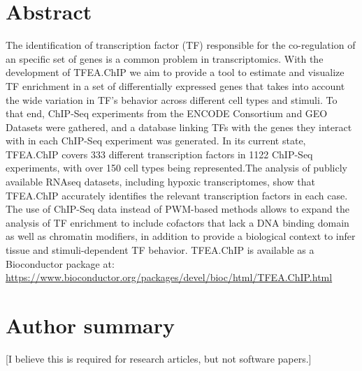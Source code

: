 \documentclass[10pt,letterpaper]{article}
\begin{document}
	\section*{Abstract}
	The identification of transcription factor (TF) responsible for the co-regulation of an specific set of genes is a common problem in transcriptomics. With the development of TFEA.ChIP we aim to provide a tool to estimate and visualize TF enrichment in a set of differentially expressed genes that takes into account the wide variation in TF's behavior across different cell types and stimuli. To that end, ChIP-Seq experiments from the ENCODE Consortium and GEO Datasets were gathered, and a database linking TFs with the genes they interact with in each ChIP-Seq experiment was generated. In its current state, TFEA.ChIP covers 333 different transcription factors in 1122 ChIP-Seq experiments, with over 150 cell types being represented.The analysis of publicly available RNAseq datasets, including hypoxic transcriptomes, show that TFEA.ChIP accurately identifies the relevant transcription factors in each case. The use of ChIP-Seq data instead of PWM-based methods allows to expand the analysis of TF enrichment to include cofactors that lack a DNA binding domain as well as chromatin modifiers, in addition to provide a biological context to infer tissue and stimuli-dependent TF behavior. TFEA.ChIP is available as a Bioconductor package at: \url{https://www.bioconductor.org/packages/devel/bioc/html/TFEA.ChIP.html} 
	
	
	\section*{Author summary}
	[I believe this is required for research articles, but not software papers.]
	\linenumbers
	
\end{document}
